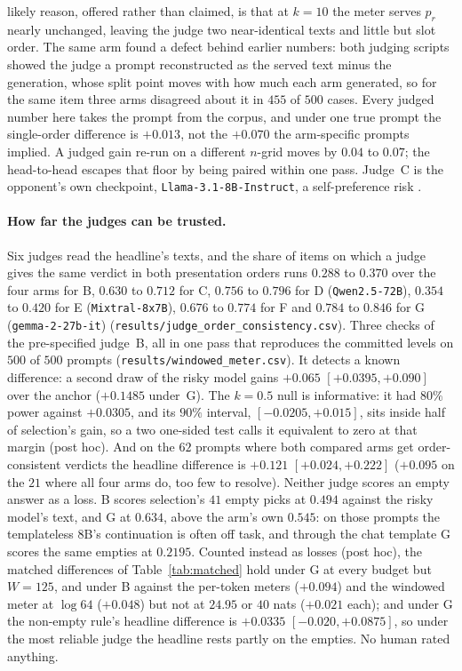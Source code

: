 likely reason, offered rather than claimed, is that at $k=10$ the meter serves $p_r$ nearly unchanged,
leaving the judge two near-identical texts and little but slot order. The same arm found a defect behind
earlier numbers: both judging scripts showed the judge a prompt reconstructed as the served text minus the
generation, whose split point moves with how much each arm generated, so for the same item three arms
disagreed about it in $455$ of $500$ cases. Every judged number here takes the prompt from the corpus, and
under one true prompt the single-order difference is $+0.013$, not the $+0.070$ the arm-specific prompts
implied. A judged gain
re-run on a different $n$-grid moves by $0.04$ to $0.07$; the head-to-head escapes that floor by being
paired within one pass. Judge~C is the opponent's own checkpoint, \texttt{Llama-3.1-8B-Instruct}, a self-preference risk
\citep{panickssery2024llm}.

\paragraph{How far the judges can be trusted.}\label{app:judgevalidity}
Six judges read the headline's texts, and the share of items on which a judge gives the same verdict in both
presentation orders runs $0.288$ to $0.370$ over the four arms for B, $0.630$ to $0.712$ for C, $0.756$ to
$0.796$ for D (\texttt{Qwen2.5-72B}), $0.354$ to $0.420$ for E (\texttt{Mixtral-8x7B}), $0.676$ to $0.774$ for F
and $0.784$ to $0.846$ for G (\texttt{gemma-2-27b-it}) (\texttt{results/\allowbreak judge\_\allowbreak order\_\allowbreak consistency.csv}). Three checks of the pre-specified judge~B, all in one pass that
reproduces the committed levels on $500$ of $500$ prompts (\texttt{results/\allowbreak windowed\_\allowbreak meter.csv}). It detects a known difference: a second draw of the risky model gains $+0.065$
$[+0.0395, +0.090]$ over the anchor ($+0.1485$ under~G). The $k=0.5$ null is informative: it had $80\%$ power
against $+0.0305$, and its $90\%$ interval, $[-0.0205, +0.015]$, sits inside half of selection's gain, so a
two one-sided test calls it equivalent to zero at that margin (post hoc). And on the $62$ prompts where both
compared arms get order-consistent verdicts the headline difference is $+0.121$ $[+0.024, +0.222]$ ($+0.095$
on the $21$ where all four arms do, too few to resolve). Neither judge scores an empty answer as a loss. B
scores selection's $41$ empty picks at $0.494$ against the risky model's text, and G at $0.634$, above the
arm's own $0.545$: on those prompts the templateless $8$B's continuation is often off task, and through the
chat template G scores the same empties at $0.2195$. Counted instead as losses (post hoc), the matched
differences of Table~\ref{tab:matched} hold under G at every budget but $W=125$, and under B against the
per-token meters ($+0.094$) and the windowed meter at $\log 64$ ($+0.048$) but not at $24.95$ or $40$ nats
($+0.021$ each); and under G the non-empty rule's headline difference is $+0.0335$ $[-0.020, +0.0875]$, so
under the most reliable judge the headline rests partly on the empties. No human rated anything.

